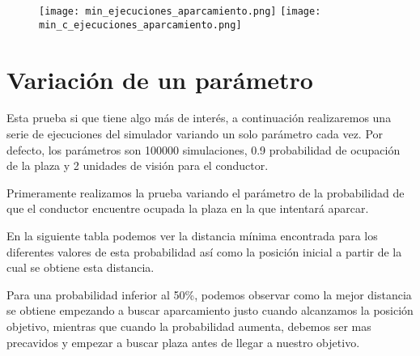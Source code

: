\newpage

\begin{figure}[h]
\texttt{[image: min\_ejecuciones\_aparcamiento.png]}
\texttt{[image: min\_c\_ejecuciones\_aparcamiento.png]}
\centering
\end{figure}

\newpage


\section{Variación de un parámetro}
Esta prueba si que tiene algo más de interés, a continuación realizaremos una serie de ejecuciones del simulador variando un solo parámetro cada vez. Por defecto, los parámetros son 100000 simulaciones, 0.9 probabilidad de ocupación de la plaza y 2 unidades de visión para el conductor.

Primeramente realizamos la prueba variando el parámetro de la probabilidad de que el conductor encuentre ocupada la plaza en la que intentará aparcar.

En la siguiente tabla podemos ver la distancia mínima encontrada para los diferentes valores de esta probabilidad así como la posición inicial a partir de la cual se obtiene esta distancia.

\begin{table}[h]
\centering
{}
\end{table}

Para una probabilidad inferior al 50\%, podemos observar como la mejor distancia se obtiene empezando a buscar aparcamiento justo cuando alcanzamos la posición objetivo, mientras que cuando la probabilidad aumenta, debemos ser mas precavidos y empezar a buscar plaza antes de llegar a nuestro objetivo.

